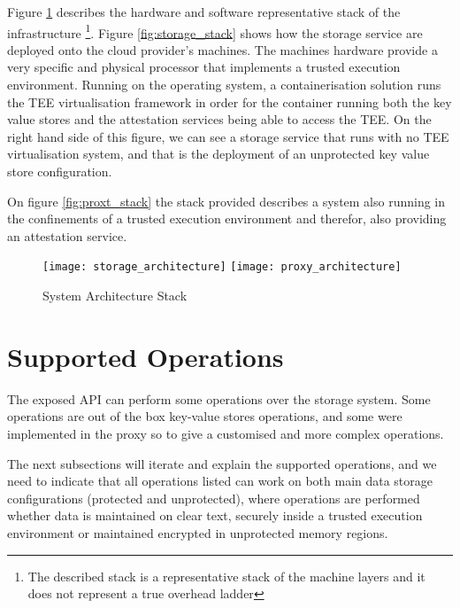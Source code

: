 Figure \ref{fig:system_architecture_stack} describes the hardware and software representative stack of the infrastructure \footnote{The described stack is a representative stack of the machine layers and it does not represent a true overhead ladder}. Figure \ref{fig:storage_stack} shows how the storage service are deployed onto the cloud provider's machines. The machines hardware provide a very specific and physical processor that implements a trusted execution environment. Running on the operating system, a containerisation solution runs the \gls{TEE} virtualisation framework in order for the container running both the key value stores and the attestation services being able to access the \gls{TEE}. On the right hand side of this figure, we can see a storage service that runs with no \gls{TEE} virtualisation system, and that is the deployment of an unprotected key value store configuration.

On figure \ref{fig:proxt_stack} the stack provided describes a system also running in the confinements of a trusted execution environment and therefor, also providing an attestation service.

\begin{figure}[htbp]
  \centering
    {\texttt{[image: storage\_architecture]}}%
    \hspace{5em}
    {\texttt{[image: proxy\_architecture]}}%
  \caption{System Architecture Stack}
  \label{fig:system_architecture_stack}
\end{figure}

\section{Supported Operations}
\label{sec:supported_operations}

The exposed \gls{API} can perform some operations over the storage system. Some operations are out of the box key-value stores operations, and some were implemented in the proxy so to give a customised and more complex operations.

The next subsections will iterate and explain the supported operations, and we need to indicate that all operations listed can work on both main data storage configurations (protected and unprotected), where operations are performed whether data is maintained on clear text, securely inside a trusted execution environment or maintained encrypted in unprotected memory regions.

